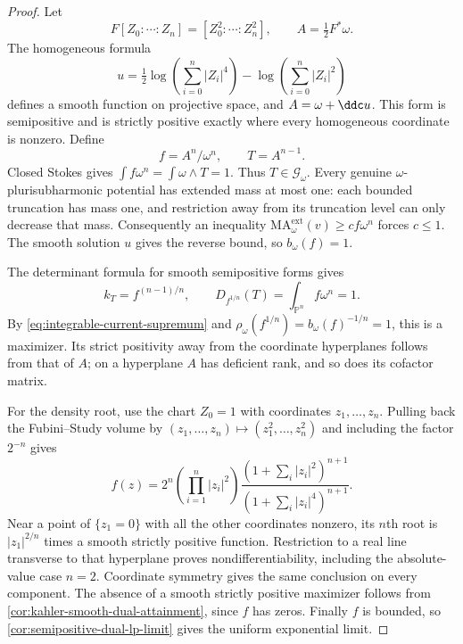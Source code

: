 \begin{proof}
Let
\[
 F[Z_0:\cdots:Z_n]=[Z_0^2:\cdots:Z_n^2],\qquad
 A=\tfrac12F^*\omega.
\]
The homogeneous formula
\[
 u=\tfrac12\log\!\left(\sum_{i=0}^n|Z_i|^4\right)
       -\log\!\left(\sum_{i=0}^n|Z_i|^2\right)
\]
defines a smooth function on projective space, and $A=\omega+\ddc u$. This form is semipositive and is strictly positive exactly where every homogeneous coordinate is nonzero. Define
\[
 f=A^n/\omega^n,\qquad T=A^{n-1}.
\]
Closed Stokes gives $\int f\omega^n=\int\omega\wedge T=1$. Thus $T\in\mathscr G_\omega$. Every genuine $\omega$-plurisubharmonic potential has extended mass at most one: each bounded truncation has mass one, and restriction away from its truncation level can only decrease that mass. Consequently an inequality $\mathrm{MA}^{\mathrm{ext}}_\omega(v)\geq c f\omega^n$ forces $c\leq1$. The smooth solution $u$ gives the reverse bound, so $b_\omega(f)=1$.

The determinant formula for smooth semipositive forms gives
\[
 k_T=f^{(n-1)/n},\qquad
 D_{f^{1/n}}(T)=\int_{\mathbb P^n}f\omega^n=1.
\]
By \eqref{eq:integrable-current-supremum} and $\rho_\omega(f^{1/n})=b_\omega(f)^{-1/n}=1$, this is a maximizer. Its strict positivity away from the coordinate hyperplanes follows from that of $A$; on a hyperplane $A$ has deficient rank, and so does its cofactor matrix.

For the density root, use the chart $Z_0=1$ with coordinates $z_1,\ldots,z_n$. Pulling back the Fubini--Study volume by $(z_1,\ldots,z_n)\mapsto(z_1^2,\ldots,z_n^2)$ and including the factor $2^{-n}$ gives
\[
 f(z)=2^n\left(\prod_{i=1}^n|z_i|^2\right)
       \frac{(1+\sum_i|z_i|^2)^{n+1}}
            {(1+\sum_i|z_i|^4)^{n+1}}.
\]
Near a point of $\{z_1=0\}$ with all the other coordinates nonzero, its $n$th root is $|z_1|^{2/n}$ times a smooth strictly positive function. Restriction to a real line transverse to that hyperplane proves nondifferentiability, including the absolute-value case $n=2$. Coordinate symmetry gives the same conclusion on every component. The absence of a smooth strictly positive maximizer follows from \cref{cor:kahler-smooth-dual-attainment}, since $f$ has zeros. Finally $f$ is bounded, so \cref{cor:semipositive-dual-lp-limit} gives the uniform exponential limit.
\end{proof}
